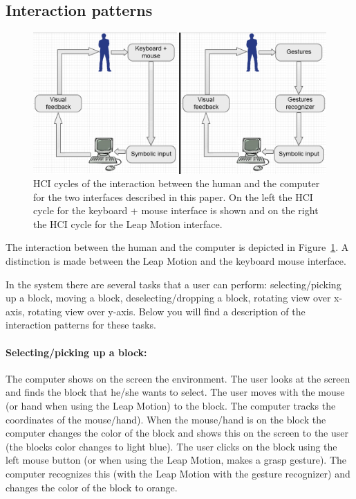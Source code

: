 \subsection{Interaction patterns}

\begin{figure}[H]
\includegraphics[width=\textwidth]{imgs/HCIcycles.png}
\caption{\label{fig:HCIcycles}HCI cycles of the interaction between the human and the computer for the two interfaces described in this paper. On the left the HCI cycle for 
the keyboard + mouse interface is shown and on the right the HCI cycle for the Leap Motion interface.}
\end{figure}

The interaction between the human and the computer is depicted in Figure~\ref{fig:HCIcycles}. A distinction is made between the Leap Motion and the keyboard mouse interface. 

In the system there are several tasks that a user can perform: selecting/picking up a block, moving a block, deselecting/dropping a block, rotating view over x-axis, rotating 
view over y-axis. Below you will find a description of the interaction patterns for these tasks.

\paragraph{Selecting/picking up a block:} The computer shows on the screen the environment. The user looks at the screen and finds the block that he/she wants to select. 
The user moves with the mouse (or hand when using the Leap Motion) to the block. The computer tracks the coordinates of the mouse/hand). When the mouse/hand is on the block the
 computer changes the color of the block and shows this on the screen to the user (the blocks color changes to light blue). The user clicks on the block using the left mouse 
 button (or when using the Leap Motion, makes a grasp gesture). The computer recognizes this (with the Leap Motion with the gesture recognizer) and changes the color of the 
 block to orange.
